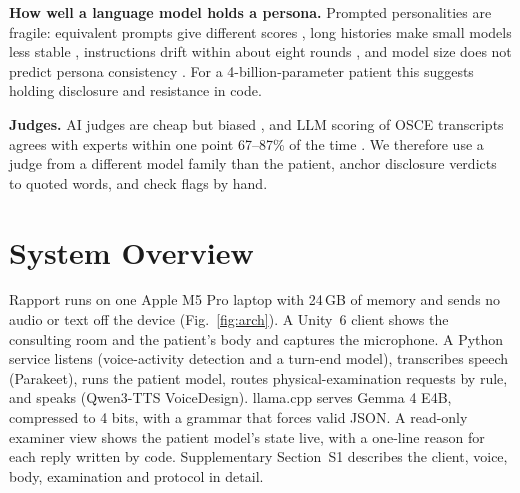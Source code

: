 \documentclass[sn-basic,Numbered]{sn-jnl}
\begin{document}
\textbf{How well a language model holds a persona.} Prompted personalities are fragile: equivalent prompts give different scores
\cite{gupta2023selfassessment}, long histories make small models less stable \cite{tosato2025persist}, instructions drift within about eight
rounds \cite{li2024instruction}, and model size does not predict persona consistency \cite{samuel2025personagym}. For a 4-billion-parameter
patient this suggests holding disclosure and resistance in code.

\textbf{Judges.} AI judges are cheap but biased \cite{zheng2023judging}, and LLM scoring of OSCE transcripts agrees with experts within one
point 67--87\% of the time \cite{geathers2025benchmarking}. We therefore use a judge from a different model family than the patient, anchor
disclosure verdicts to quoted words, and check flags by hand.

\section{System Overview}\label{sec:system}
Rapport runs on one Apple M5 Pro laptop with 24\,GB of memory and sends no audio or text off the device (Fig.~\ref{fig:arch}). A Unity~6
client shows the consulting room and the patient's body and captures the microphone. A Python service listens (voice-activity detection and a
turn-end model), transcribes speech (Parakeet), runs the patient model, routes physical-examination requests by rule, and speaks
(Qwen3-TTS VoiceDesign). llama.cpp \cite{llamacpp} serves Gemma 4 E4B, compressed to 4 bits, with a grammar that forces valid JSON. A read-only
examiner view shows the patient model's state live, with a one-line reason for each reply written by code. Supplementary Section~S1 describes the client, voice, body, examination and protocol in detail.
\end{document}

